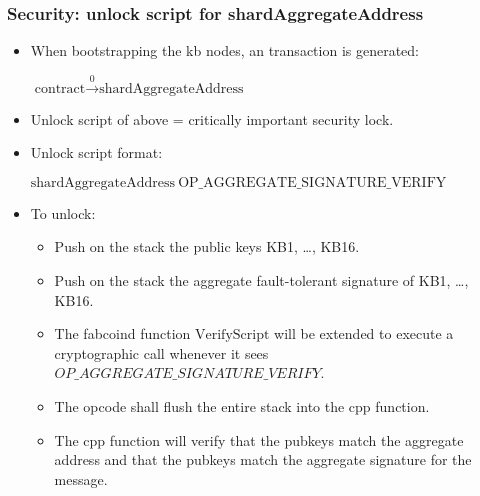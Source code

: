 \begin{frame}[fragile]
\frametitle{Security: unlock script for shardAggregateAddress}
\begin{itemize}
\item When bootstrapping the kb nodes, an transaction is generated:

$\text{contract} \stackrel{0}{\to}\text{shardAggregateAddress} $

\item Unlock script of above = critically important security lock.
\item Unlock script format:

$\text{shardAggregateAddress} ~\text{OP\_AGGREGATE\_SIGNATURE\_VERIFY} $

\item To unlock:
\begin{itemize}
\item Push on the stack the public keys KB1, \dots, KB16.
\item Push on the stack the aggregate fault-tolerant signature of KB1, \dots, KB16.
\item The fabcoind function $\text{VerifyScript}$ will be extended to execute a cryptographic call whenever it sees $OP\_AGGREGATE\_SIGNATURE\_VERIFY$.
\item The opcode shall flush the entire stack into the cpp function.
\item The cpp function will verify that the pubkeys match the aggregate address and that the pubkeys match the aggregate signature for the message.
\end{itemize}
\end{itemize}
\end{frame}